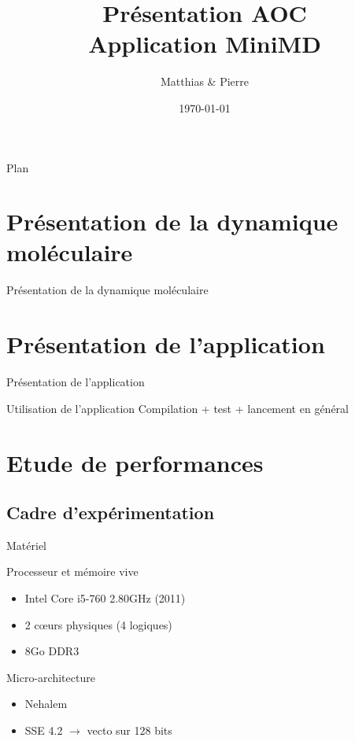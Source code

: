 \documentclass[9.5pt]{beamer}
\title[MPNA : MIS]{Présentation AOC \\Application MiniMD}
\author[\bsc{Beaupère} \& \bsc{Granger}]{Matthias \bsc{Beaupère} \& Pierre \bsc{Granger}}
\institute{M2 CHPS}
\date{\today}
\begin{document}

\begin{frame}
  \titlepage
\end{frame}

\begin{frame}{Plan}
	\tableofcontents[hideallsubsections]
\end{frame}

\section{Présentation de la dynamique moléculaire}
	\begin{frame}{Présentation de la dynamique moléculaire}
	\end{frame}

\section{Présentation de l'application}
	\begin{frame}{Présentation de l'application}
	\end{frame}

	\begin{frame}{Utilisation de l'application}
		Compilation + test + lancement en général
	\end{frame}

\section{Etude de performances}
	\subsection{Cadre d'expérimentation}
		\begin{frame}{Matériel}
			\begin{block}{Processeur et mémoire vive}
				\begin{itemize}
					\item Intel Core i5-760 2.80GHz (2011)
					\item 2 c\oe{}urs physiques (4 logiques)
					\item 8Go DDR3
				\end{itemize}
			\end{block}

			\begin{block}{Micro-architecture}
				\begin{itemize}
					\item Nehalem
					\item SSE 4.2 $\rightarrow$ vecto sur 128 bits
				\end{itemize}
			\end{block}
		\end{frame}
\end{document}
